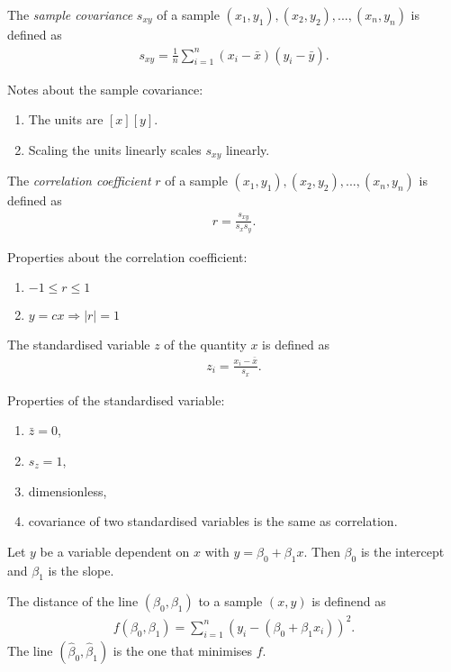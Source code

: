 \documentclass{article}
\begin{document}
\begin{definition}
	The \emph{sample covariance} $s_{xy}$ of a sample $(x_1, y_1), (x_2, y_2), ..., (x_n, y_n)$
	is defined as
	\begin{align*}
		s_{xy} = \frac{1}{n}\sum_{i=1}^n (x_i - \bar x)(y_i - \bar y).
	\end{align*}
\end{definition}
Notes about the sample covariance:
\begin{enumerate}
	\item The units are $[x][y]$.
	\item Scaling the units linearly scales $s_{xy}$ linearly.
\end{enumerate}
\begin{definition}
	The \emph{correlation coefficient} $r$ of a sample $(x_1, y_1), (x_2, y_2), ..., (x_n, y_n)$ is defined as
	\begin{align*}
		r = \frac{s_{xy}}{s_x s_y}.
	\end{align*}
\end{definition}
Properties about the correlation coefficient:
\begin{enumerate}
	\item $-1 \leq r \leq 1$
	\item $y=cx \Rightarrow |r|=1$
\end{enumerate}
\begin{definition}
	The standardised variable $z$ of the quantity $x$ is defined as
	\begin{align*}
		z_i = \frac{x_i-\bar x}{s_x}.
	\end{align*}
\end{definition}
Properties of the standardised variable:
\begin{enumerate}
	\item $\bar z = 0$,
	\item $s_z = 1$,
	\item dimensionless,
	\item covariance of two standardised variables is the same as correlation.
\end{enumerate}
\begin{definition}
	Let $y$ be a variable dependent on $x$ with $y=\beta_0 + \beta_1 x$. Then
	$\beta_0$ is the intercept and $\beta_1$ is the slope.
\end{definition}
\begin{definition}
	The distance of the line $(\beta_0,\beta_1)$ to a sample $(x,y)$ is definend as
	\begin{align*}
		f(\beta_0, \beta_1) = \sum_{i=1}^n (y_i -(\beta_0 + \beta_1 x_i))^2.
	\end{align*}
	The line $(\hat\beta_0, \hat\beta_1)$ is the one that minimises $f$.
\end{definition}
\end{document}

